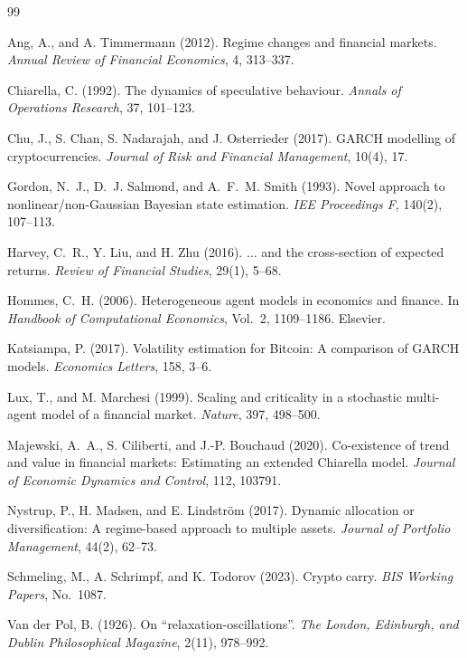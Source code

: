 \documentclass[11pt,a4paper]{article}
\begin{document}
\begin{thebibliography}{99}

Ang, A., and A. Timmermann (2012).
Regime changes and financial markets.
\emph{Annual Review of Financial Economics}, 4, 313--337.

Chiarella, C. (1992).
The dynamics of speculative behaviour.
\emph{Annals of Operations Research}, 37, 101--123.

Chu, J., S. Chan, S. Nadarajah, and J. Osterrieder (2017).
GARCH modelling of cryptocurrencies.
\emph{Journal of Risk and Financial Management}, 10(4), 17.

Gordon, N.~J., D.~J. Salmond, and A.~F.~M. Smith (1993).
Novel approach to nonlinear/non-Gaussian Bayesian state estimation.
\emph{IEE Proceedings F}, 140(2), 107--113.

Harvey, C.~R., Y. Liu, and H. Zhu (2016).
$\dots$ and the cross-section of expected returns.
\emph{Review of Financial Studies}, 29(1), 5--68.

Hommes, C.~H. (2006).
Heterogeneous agent models in economics and finance.
In \emph{Handbook of Computational Economics}, Vol.~2, 1109--1186. Elsevier.

Katsiampa, P. (2017).
Volatility estimation for Bitcoin: A comparison of GARCH models.
\emph{Economics Letters}, 158, 3--6.

Lux, T., and M. Marchesi (1999).
Scaling and criticality in a stochastic multi-agent model of a financial market.
\emph{Nature}, 397, 498--500.

Majewski, A.~A., S. Ciliberti, and J.-P. Bouchaud (2020).
Co-existence of trend and value in financial markets: Estimating an extended Chiarella model.
\emph{Journal of Economic Dynamics and Control}, 112, 103791.

Nystrup, P., H. Madsen, and E. Lindstr\"om (2017).
Dynamic allocation or diversification: A regime-based approach to multiple assets.
\emph{Journal of Portfolio Management}, 44(2), 62--73.

Schmeling, M., A. Schrimpf, and K. Todorov (2023).
Crypto carry.
\emph{BIS Working Papers}, No.~1087.

Van der Pol, B. (1926).
On ``relaxation-oscillations''.
\emph{The London, Edinburgh, and Dublin Philosophical Magazine}, 2(11), 978--992.

\end{thebibliography}
\end{document}
